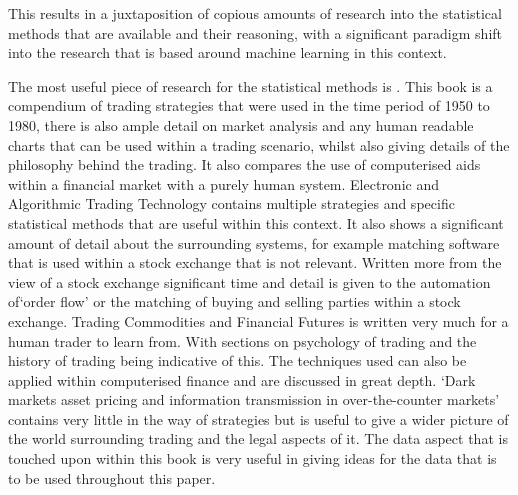 \documentclass[conference]{IEEEtran}
\begin{document}
This results in a juxtaposition of copious amounts of research into the statistical methods that are available and their reasoning, with a significant paradigm shift into the research that is based around machine learning in this context.

The most useful piece of research for the statistical methods is \cite{Murphy1999}. This book is a compendium of trading strategies that were used in the time period of 1950 to 1980, there is also ample detail on market analysis and any human readable charts that can be used within a trading scenario, whilst also giving details of the philosophy behind the trading. It also compares the use of computerised aids within a financial market with a purely human system. Electronic and Algorithmic Trading Technology \cite{Kim2007} contains multiple strategies and specific statistical methods that are useful within this context. It also shows a significant amount of detail about the surrounding systems, for example matching software that is used within a stock exchange that is not relevant. Written more from the view of a stock exchange significant time and detail is given to the automation of`order flow' or the matching of buying and selling parties within a stock exchange. Trading Commodities and Financial Futures \cite{Kleinman2005} is written very much for a human trader to learn from. With sections on psychology of trading and the history of trading being indicative of this. The techniques used can also be applied within computerised finance and are discussed in great depth. `Dark markets asset pricing and information transmission in over-the-counter markets' \cite{Duffie2012} contains very little in the way of strategies but is useful to give a wider picture of the world surrounding trading and the legal aspects of it. The data aspect that is touched upon within this book is very useful in giving ideas for the data that is to be used throughout this paper.
\end{document}
